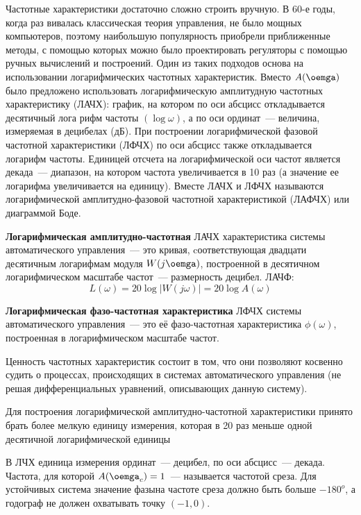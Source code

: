 Частотные характеристики достаточно сложно строить вручную. В 60-е годы, когда раз вивалась классическая теория управления, не было мощных компьютеров, поэтому наибольшую популярность приобрели приближенные методы, с помощью которых можно было проектировать регуляторы с помощью ручных вычислений и построений. Один из таких подходов основа на использовании логарифмических частотных характеристик. 
Вместо $A(\oemga)$ было предложено использовать логарифмическую амплитудную частотных характеристику (ЛАЧХ): график, на котором по оси абсцисс откладывается десятичный лога рифм частоты $(\log\omega)$, а по оси ординат~--- величина, измеряемая в децибелах (дБ). При построении логарифмической фазовой частотной характеристики (ЛФЧХ) по оси абсцисс также откладывается логарифм частоты. Единицей отсчета на логарифмической оси частот является декада~--- диапазон, на котором частота увеличивается в 10 раз (а значение ее логарифма увеличивается на единицу). Вместе ЛАЧХ и ЛФЧХ называются логарифмической амплитудно-фазовой частотной характеристикой (ЛАФЧХ) или диаграммой Боде.

\textbf{Логарифмическая амплитудно-частотная} ЛАЧХ характеристика системы автоматического управления~--- это кривая, cоответствующая двадцати десятичным логарифмам модуля $W(j \oemga)$, построенной в десятичном логарифмическом масштабе частот~--- размерность децибел. ЛАЧФ:
\begin{equation}
    L(\omega) = 20 \log{|W(j \omega)|} = 20 \log{A(\omega)}
\end{equation}

\textbf{Логарифмическая фазо-частотная характеристика} ЛФЧХ системы автоматического управления~--- это её фазо-частотная характеристика $\phi(\omega)$, построенная в логарифмическом масштабе частот.

Ценность частотных характеристик состоит в том, что они позволяют косвенно судить о процессах, происходящих в системах автоматического управления (не решая дифференциальных уравнений, описывающих данную систему).

Для построения логарифмической амплитудно-частотной характеристики принято брать более мелкую единицу измерения, которая в 20 раз меньше одной десятичной логарифмической единицы

В ЛЧХ единица измерения ординат~--- децибел, по оси абсцисс~--- декада. Частота, для которой $A(\oemga_c) = 1$~--- называется частотой среза. Для устойчивых система значение фазына частоте среза должно быть больше $-180^o$, а годограф не должен охватывать точку $(-1, 0)$.














